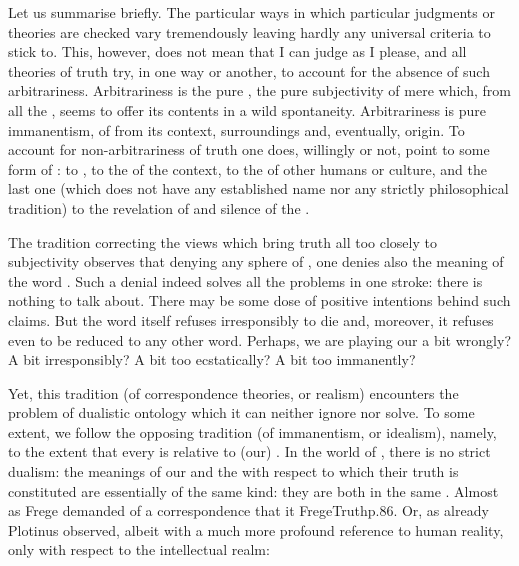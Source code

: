 \pa\label{pa:immedArbitrary} Let us summarise briefly.
The particular ways in which particular judgments or theories are checked 
vary tremendously leaving hardly any universal criteria to stick to.  This,
however, does not mean that I can judge as I please, and all {theories of truth}
try, in one way or another, to account for the absence of such arbitrariness.
Arbitrariness is the pure , the pure subjectivity of mere  which,  from all the , seems to offer its
contents in a wild spontaneity. Arbitrariness is pure
{immanentism},  of  from its context,
surroundings and, eventually, origin.  To account for non-arbitrariness of
truth one does, willingly or not, point to some form of :
 to ,  to the  of
the context,  to the  of other humans or culture,
and the last one (which does not have any established name nor any strictly
philosophical tradition) to the revelation of  and silence of the
.

The tradition correcting the views which bring truth all too closely to
subjectivity observes that denying any sphere of
, one denies also the meaning of the word . Such a
denial indeed solves all the problems in one stroke: there is nothing to talk
about. There may be some dose of positive intentions behind such claims. But the
word itself refuses irresponsibly to die and, moreover, it refuses even to be
reduced to any other word. Perhaps, we are playing our  a bit
wrongly? A bit irresponsibly? A bit too ecstatically? A bit too {immanently}?

Yet, this tradition (of correspondence theories, or realism) encounters the
problem of dualistic ontology which it can neither ignore nor solve.  To some
extent, we follow the opposing tradition (of immanentism, or idealism), namely,
to the extent that every  is relative to (our) . In
the world of , there is no strict dualism: the {meanings} of
our  and the  with respect to which their truth is
constituted are essentially of the same kind: they are both  in
the same . Almost as Frege demanded of a correspondence that it
\citet{can only be perfect if the corresponding things coincide and are,
  therefore, not distinct things at all.}{FregeTruth}{p.86. Or, as already
  Plotinus observed, albeit with a much more profound reference to human
  reality, only with respect to the intellectual realm: }

